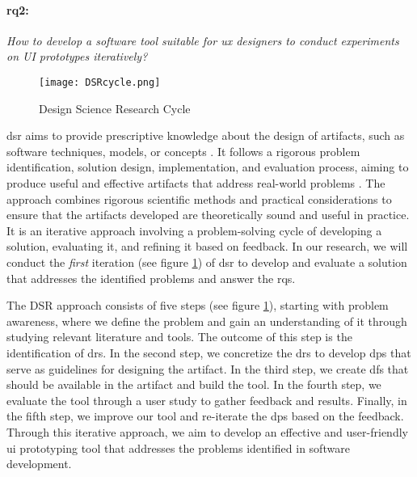 \paragraph{\ac{rq}2:} \textit{How to develop a software tool suitable for \ac{ux} designers to conduct experiments on UI prototypes iteratively?}

\begin{figure}[ht]
    \centering
    \texttt{[image: DSRcycle.png]}
    \caption[Design Science Research Cycle]{Design Science Research Cycle \cite{paper:designprinciple:vk}}
    \label{intro:fig:dps}
\end{figure}

\ac{dsr} aims to provide prescriptive knowledge about the design of artifacts, such as software techniques, models, or concepts \cite{paper:designprinciple:vk}.
It follows a rigorous problem identification, solution design, implementation, and evaluation process, aiming to produce useful and effective artifacts that address real-world problems \cite{paper:designprinciple:gregor}. 
The approach combines rigorous scientific methods and practical considerations to ensure that the artifacts developed are theoretically sound and useful in practice.
It is an iterative approach involving a problem-solving cycle of developing a solution, evaluating it, and refining it based on feedback. 
In our research, we will conduct the \textit{first} iteration (see figure \ref{intro:fig:dps}) of \ac{dsr} to develop and evaluate a solution that addresses the identified problems and answer the \ac{rq}s.

The DSR approach consists of five steps (see figure \ref{intro:fig:dps}), starting with problem awareness, where we define the problem and gain an understanding of it through studying relevant literature and tools. 
The outcome of this step is the identification of \ac{dr}s. 
In the second step, we concretize the \ac{dr}s to develop \ac{dp}s that serve as guidelines for designing the artifact. 
In the third step, we create \ac{df}s that should be available in the artifact and build the tool.
In the fourth step, we evaluate the tool through a user study to gather feedback and results. 
Finally, in the fifth step, we improve our tool and re-iterate the \ac{dp}s based on the feedback. 
Through this iterative approach, we aim to develop an effective and user-friendly \ac{ui} prototyping tool that addresses the problems identified in software development.


